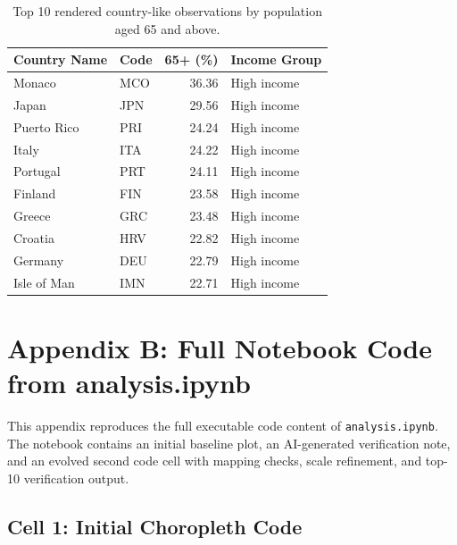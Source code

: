 \documentclass[11pt]{article}
\begin{document}
\begin{table}[H]
    \centering
    \caption{Top 10 rendered country-like observations by population aged 65 and above.}
    \label{tab:top10}
    \begin{tabular}{llrl}
        \toprule
        Country Name & Code & 65+ (\%) & Income Group \\
        \midrule
        Monaco & MCO & 36.36 & High income \\
        Japan & JPN & 29.56 & High income \\
        Puerto Rico & PRI & 24.24 & High income \\
        Italy & ITA & 24.22 & High income \\
        Portugal & PRT & 24.11 & High income \\
        Finland & FIN & 23.58 & High income \\
        Greece & GRC & 23.48 & High income \\
        Croatia & HRV & 22.82 & High income \\
        Germany & DEU & 22.79 & High income \\
        Isle of Man & IMN & 22.71 & High income \\
        \bottomrule
    \end{tabular}
\end{table}

\section*{Appendix B: Full Notebook Code from analysis.ipynb}

This appendix reproduces the full executable code content of \texttt{analysis.ipynb}. The notebook contains an initial baseline plot, an AI-generated verification note, and an evolved second code cell with mapping checks, scale refinement, and top-10 verification output.

\subsection*{Cell 1: Initial Choropleth Code}
\end{document}
